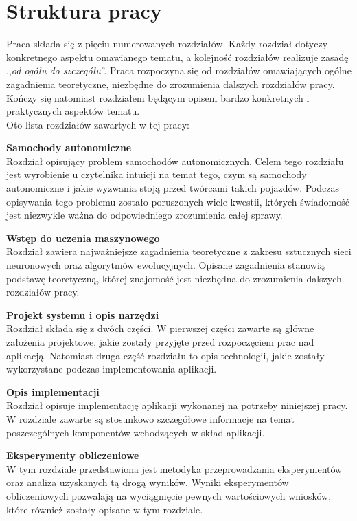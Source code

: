 \section*{Struktura pracy}
Praca składa się z pięciu numerowanych rozdziałów. Każdy rozdział dotyczy konkretnego aspektu omawianego tematu, a kolejność rozdziałów realizuje zasadę ,,\textit{od ogółu do szczegółu}''. Praca rozpoczyna się od rozdziałów omawiających ogólne zagadnienia teoretyczne, niezbędne do zrozumienia dalszych rozdziałów pracy. Kończy się natomiast rozdziałem będącym opisem bardzo konkretnych i praktycznych aspektów tematu. \\
Oto lista rozdziałów zawartych w tej pracy:
\begin{enumerate*}
\item \textbf{Samochody autonomiczne} \\
Rozdział opisujący problem samochodów autonomicznych. Celem tego rozdziału jest wyrobienie u czytelnika intuicji na temat tego, czym są samochody autonomiczne i jakie wyzwania stoją przed twórcami takich pojazdów. Podczas opisywania tego problemu zostało poruszonych wiele kwestii, których świadomość jest niezwykle ważna do odpowiedniego zrozumienia całej sprawy.
\item \textbf{Wstęp do uczenia maszynowego} \\
Rozdział zawiera najważniejsze zagadnienia teoretyczne z zakresu sztucznych sieci neuronowych oraz algorytmów ewolucyjnych. Opisane zagadnienia stanowią podstawę teoretyczną, której znajomość jest niezbędna do zrozumienia dalszych rozdziałów pracy.
\item \textbf{Projekt systemu i opis narzędzi} \\
Rozdział składa się z dwóch części. W pierwszej części zawarte są główne założenia projektowe, jakie zostały przyjęte przed rozpoczęciem prac nad aplikacją. Natomiast druga część rozdziału to opis technologii, jakie zostały wykorzystane podczas implementowania aplikacji.
\item \textbf{Opis implementacji} \\
Rozdział opisuje implementację aplikacji wykonanej na potrzeby niniejszej pracy. W rozdziale zawarte są stosunkowo szczegółowe informacje na temat poszczególnych komponentów wchodzących w skład aplikacji.
\item \textbf{Eksperymenty obliczeniowe} \\
W tym rozdziale przedstawiona jest metodyka przeprowadzania eksperymentów oraz analiza uzyskanych tą drogą wyników. Wyniki eksperymentów obliczeniowych pozwalają na wyciągnięcie pewnych wartościowych wniosków, które również zostały opisane w tym rozdziale.
\end{enumerate*}
